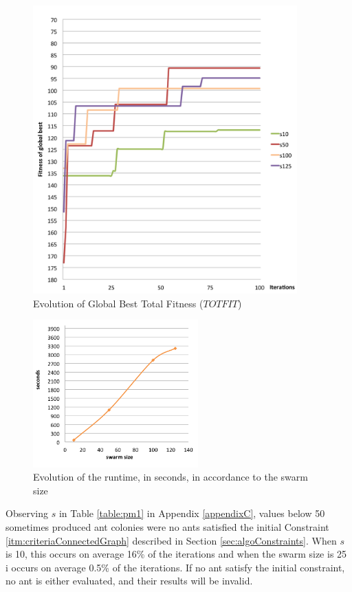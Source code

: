 \begin{figure}[H]
\begin{center}
  \includegraphics[width=4in]{assets/svsitest.png}
  \end{center}
  \caption{Evolution of Global Best Total Fitness ($TOTFIT$)}
  \label{fig:svsitesting} 
\end{figure}

\begin{figure}[H]
\begin{center}
  \includegraphics[width=2.5in]{assets/svsiruntime.png}
  \end{center}
  \caption{Evolution of the runtime, in seconds, in accordance to the swarm size}
  \label{fig:svsiruntime} 
\end{figure}


Observing $s$ in Table \vref{table:pm1} in Appendix \ref{appendixC}, values below 50 sometimes produced ant colonies were no ants satisfied the initial Constraint \ref{itm:criteriaConnectedGraph} described in Section \vref{sec:algoConstraints}. When $s$ is 10, this occurs on average 16\% of the iterations and when the swarm size is 25 i occurs on average 0.5\% of the iterations. If no ant satisfy the initial constraint, no ant is either evaluated, and their results will be invalid.

